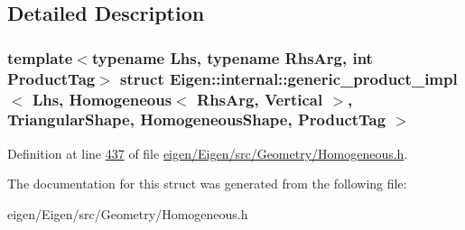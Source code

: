 \subsection{Detailed Description}
\subsubsection*{template$<$typename Lhs, typename Rhs\+Arg, int Product\+Tag$>$\newline
struct Eigen\+::internal\+::generic\+\_\+product\+\_\+impl$<$ Lhs, Homogeneous$<$ Rhs\+Arg, Vertical $>$, Triangular\+Shape, Homogeneous\+Shape, Product\+Tag $>$}



Definition at line \hyperlink{eigen_2_eigen_2src_2_geometry_2_homogeneous_8h_source_l00437}{437} of file \hyperlink{eigen_2_eigen_2src_2_geometry_2_homogeneous_8h_source}{eigen/\+Eigen/src/\+Geometry/\+Homogeneous.\+h}.



The documentation for this struct was generated from the following file\+:\begin{DoxyCompactItemize}
\item 
eigen/\+Eigen/src/\+Geometry/\+Homogeneous.\+h\end{DoxyCompactItemize}
